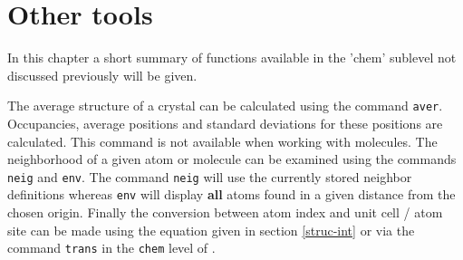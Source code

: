 \section{Other tools \label{chem-other}}

In this chapter a short summary of functions available in the 'chem'
sublevel not discussed previously will be given. \par

The average structure of a crystal can be calculated using the
command {\tt aver}. Occupancies, average positions and standard
deviations for these positions are calculated. This command is not
available when working with molecules. The neighborhood of a given
atom or molecule can be examined using the commands {\tt neig} and
{\tt env}. The command {\tt neig} will use the currently stored
neighbor definitions whereas {\tt env} will display {\bf all} atoms
found in a given distance from the chosen origin. Finally the
conversion between atom index and unit cell / atom site can be made
using the equation given in section \ref{struc-int} or via the
command {\tt trans} in the {\tt chem} level of \discus.

